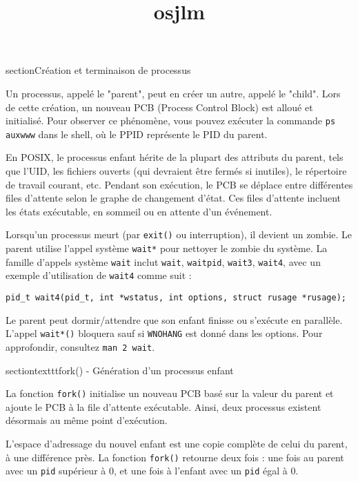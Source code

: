 \documentclass[12pt]{article}
\title{osjlm}
\author{}
\date{}
\begin{document}
\maketitle
\tableofcontents
\newpage

section{Création et terminaison de processus}

Un processus, appelé le "parent", peut en créer un autre, appelé le "child". Lors de cette création, un nouveau PCB (Process Control Block) est alloué et initialisé. Pour observer ce phénomène, vous pouvez exécuter la commande \texttt{ps auxwww} dans le shell, où le PPID représente le PID du parent.

En POSIX, le processus enfant hérite de la plupart des attributs du parent, tels que l'UID, les fichiers ouverts (qui devraient être fermés si inutiles), le répertoire de travail courant, etc. Pendant son exécution, le PCB se déplace entre différentes files d'attente selon le graphe de changement d'état. Ces files d'attente incluent les états exécutable, en sommeil ou en attente d'un événement.

Lorsqu'un processus meurt (par \texttt{exit()} ou interruption), il devient un zombie. Le parent utilise l'appel système \texttt{wait*} pour nettoyer le zombie du système. La famille d'appels système \texttt{wait} inclut \texttt{wait}, \texttt{waitpid}, \texttt{wait3}, \texttt{wait4}, avec un exemple d'utilisation de \texttt{wait4} comme suit :

\begin{lstlisting}
pid_t wait4(pid_t, int *wstatus, int options, struct rusage *rusage);
\end{lstlisting}

Le parent peut dormir/attendre que son enfant finisse ou s'exécute en parallèle. L'appel \texttt{wait*()} bloquera sauf si \texttt{WNOHANG} est donné dans les options. Pour approfondir, consultez \texttt{man 2 wait}.

section{texttt{fork()} - Génération d'un processus enfant}

La fonction \texttt{fork()} initialise un nouveau PCB basé sur la valeur du parent et ajoute le PCB à la file d'attente exécutable. Ainsi, deux processus existent désormais au même point d'exécution.

L'espace d'adressage du nouvel enfant est une copie complète de celui du parent, à une différence près. La fonction \texttt{fork()} retourne deux fois : une fois au parent avec un \texttt{pid} supérieur à 0, et une fois à l'enfant avec un \texttt{pid} égal à 0.
\end{document}
